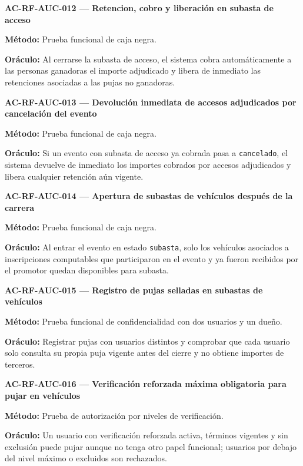\documentclass[10pt,letterpaper]{article}
\begin{document}
\noindent\textbf{AC-RF-AUC-012 --- Retencion, cobro y liberación en subasta de acceso}\par
\textbf{Método:} Prueba funcional de caja negra.\par
\textbf{Oráculo:} Al cerrarse la subasta de acceso, el sistema cobra automáticamente a las personas ganadoras el importe adjudicado y libera de inmediato las retenciones asociadas a las pujas no ganadoras.\par\vspace{0.45em}
\noindent\textbf{AC-RF-AUC-013 --- Devolución inmediata de accesos adjudicados por cancelación del evento}\par
\textbf{Método:} Prueba funcional de caja negra.\par
\textbf{Oráculo:} Si un evento con subasta de acceso ya cobrada pasa a \texttt{cancelado}, el sistema devuelve de inmediato los importes cobrados por accesos adjudicados y libera cualquier retención aún vigente.\par\vspace{0.45em}
\noindent\textbf{AC-RF-AUC-014 --- Apertura de subastas de vehículos después de la carrera}\par
\textbf{Método:} Prueba funcional de caja negra.\par
\textbf{Oráculo:} Al entrar el evento en estado \texttt{subasta}, solo los vehículos asociados a inscripciones computables que participaron en el evento y ya fueron recibidos por el promotor quedan disponibles para subasta.\par\vspace{0.45em}
\noindent\textbf{AC-RF-AUC-015 --- Registro de pujas selladas en subastas de vehículos}\par
\textbf{Método:} Prueba funcional de confidencialidad con dos usuarios y un dueño.\par
\textbf{Oráculo:} Registrar pujas con usuarios distintos y comprobar que cada usuario solo consulta su propia puja vigente antes del cierre y no obtiene importes de terceros.\par\vspace{0.45em}
\noindent\textbf{AC-RF-AUC-016 --- Verificación reforzada máxima obligatoria para pujar en vehículos}\par
\textbf{Método:} Prueba de autorización por niveles de verificación.\par
\textbf{Oráculo:} Un usuario con verificación reforzada activa, términos vigentes y sin exclusión puede pujar aunque no tenga otro papel funcional; usuarios por debajo del nivel máximo o excluidos son rechazados.\par\vspace{0.45em}
\end{document}

